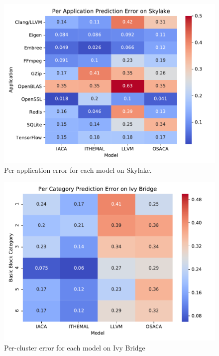 \begin{figure}
\includegraphics[width=\columnwidth]{figures/skl-app-err.pdf}
\caption{Per-application error for each model on Skylake. }
\label{fig:skl-app-err}
\end{figure}

\begin{figure}
\includegraphics[width=\columnwidth]{figures/ivb-cluster-err.pdf}
\caption{Per-cluster error for each model on Ivy Bridge}
\label{fig:ivb-cluster-err}
\end{figure}

